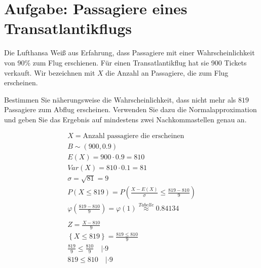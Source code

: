 \section{Aufgabe: Passagiere eines Transatlantikflugs}

Die Lufthansa Weiß aus Erfahrung, dass Passagiere mit einer Wahrscheinlichkeit
von $90\%$ zum Flug erschienen. Für einen Transatlantikflug hat sie 900 Tickets
verkauft. Wir bezeichnen mit $X$ die Anzahl an Passagiere, die zum Flug
erscheinen.

Bestimmen Sie näherungsweise die Wahrscheinlichkeit, dass nicht mehr als $819$
Passagiere zum Abflug erscheinen. Verwenden Sie dazu die Normalapproximation
und geben Sie das Ergebnis auf mindestens zwei Nachkommastellen genau an.

\begin{align*}
    X = \text{Anzahl passagiere die erscheinen}                                             \\
    B \sim (900, 0.9)                                                                       \\
    E(X) = 900 \cdot 0.9 = 810                                                              \\
    Var(X) = 810 \cdot 0.1 = 81                                                             \\
    \sigma = \sqrt{81} = 9                                                                  \\
    P(X \leq 819) = P\left(\frac{X - E(X)}{\sigma} \leq \frac{819 - 810}{9}\right)          \\
    \varphi\left(\frac{819 - 810}{9}\right) = \varphi(1) \overset{Tabelle}{\approx} 0.84134 \\\\
    Z = \frac{X - 810}{9} \\
    \left\{X \leq 819\right\} = \frac{819 \leq 810}{9} \\
    \frac{819}{9} \leq \frac{810}{9} \quad | \cdot 9\\
    819 \leq 810 \quad | \cdot 9\\
\end{align*}
